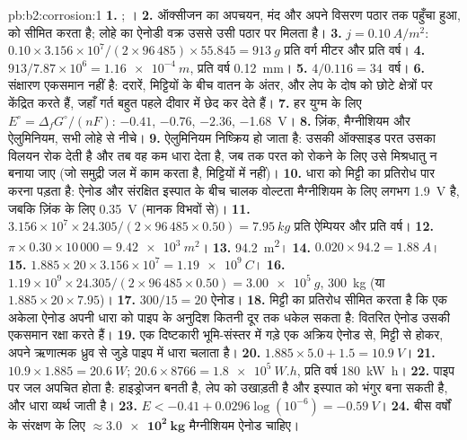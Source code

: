 \begin{solution}{pb:b2:corrosion:1}
\textbf{1.} ; ।
\textbf{2.} ऑक्सीजन का अपचयन, मंद और अपने विसरण पठार तक पहुँचा हुआ,
 को सीमित करता है; लोहे का ऐनोडी वक्र उससे उसी पठार पर मिलता है।
\textbf{3.} $j = \qty{0.10}{A/m^2}$: $0.10 \times 3.156 \times 10^7/(2 \times 96\,485)
\times 55.845 = \qty{913}{g}$ प्रति वर्ग मीटर और प्रति वर्ष।
\textbf{4.} $913/7.87 \times 10^6 = \qty{1.16e-4}{m}$, प्रति वर्ष \qty{0.12}{mm}।
\textbf{5.} $4/0.116 = 34$~वर्ष।
\textbf{6.} संक्षारण एकसमान नहीं है: दरारें, मिट्टियों के बीच वातन के
अंतर, और लेप के दोष  को छोटे क्षेत्रों पर केंद्रित करते हैं,
जहाँ गर्त बहुत पहले दीवार में छेद कर देते हैं।
\textbf{7.} हर युग्म के लिए $E^\circ = \Delta_f G^\circ/(nF)$:  $-0.41$,  $-0.76$,
 $-2.36$,  \qty{-1.68}{V}।
\textbf{8.} ज़िंक, मैग्नीशियम और ऐलुमिनियम, सभी लोहे से नीचे।
\textbf{9.} ऐलुमिनियम निष्क्रिय हो जाता है: उसकी ऑक्साइड परत उसका विलयन रोक देती है और
तब वह कम धारा देता है, जब तक परत को रोकने के लिए उसे मिश्रधातु न बनाया जाए (जो
समुद्री जल में काम करता है, मिट्टियों में नहीं)।
\textbf{10.} धारा को मिट्टी का प्रतिरोध पार करना पड़ता है: ऐनोड और संरक्षित
इस्पात के बीच चालक वोल्टता मैग्नीशियम के लिए लगभग \qty{1.9}{V} है, जबकि
ज़िंक के लिए \qty{0.35}{V} (मानक विभवों से)।
\textbf{11.} $3.156 \times 10^7 \times 24.305/(2 \times 96\,485 \times 0.50) =
\qty{7.95}{kg}$ प्रति ऐम्पियर और प्रति वर्ष।
\textbf{12.} $\pi \times 0.30 \times 10\,000 = \qty{9.42e3}{m^2}$।
\textbf{13.} \qty{94.2}{m^2}।
\textbf{14.} $0.020 \times 94.2 = \qty{1.88}{A}$।
\textbf{15.} $1.885 \times 20 \times 3.156 \times 10^7 = \qty{1.19e9}{C}$।
\textbf{16.} $1.19 \times 10^9 \times 24.305/(2 \times 96\,485 \times 0.50) =
\qty{3.00e5}{g}$, \qty{300}{kg} (या $1.885 \times 20 \times 7.95$)।
\textbf{17.} $300/15 = 20$ ऐनोड।
\textbf{18.} मिट्टी का प्रतिरोध सीमित करता है कि एक अकेला ऐनोड अपनी धारा को पाइप के अनुदिश
कितनी दूर तक धकेल सकता है: वितरित ऐनोड उसकी एकसमान रक्षा करते हैं।
\textbf{19.} एक दिष्टकारी भूमि-संस्तर में गड़े एक अक्रिय ऐनोड से, मिट्टी से होकर,
अपने ऋणात्मक ध्रुव से जुड़े पाइप में धारा चलाता है।
\textbf{20.} $1.885 \times 5.0 + 1.5 = \qty{10.9}{V}$।
\textbf{21.} $10.9 \times 1.885 = \qty{20.6}{W}$; $20.6 \times 8766 = \qty{1.8e5}{W.h}$,
प्रति वर्ष \qty{180}{kW.h}।
\textbf{22.} पाइप पर जल अपचित होता है: हाइड्रोजन बनती है, लेप को उखाड़ती है और
इस्पात को भंगुर बना सकती है, और धारा व्यर्थ जाती है।
\textbf{23.} $E < -0.41 + 0.0296\log(10^{-6}) = \qty{-0.59}{V}$।
\textbf{24.} बीस वर्षों के संरक्षण के लिए $\boldsymbol{\approx \qty{3.0e2}{kg}}$
मैग्नीशियम ऐनोड चाहिए।
\end{solution}
